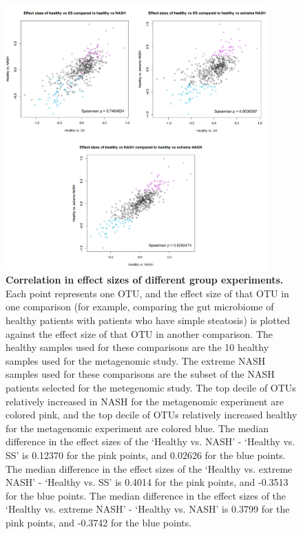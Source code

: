 \begin{figure}[h]
\begin{center}
\includegraphics[width=0.9\textwidth]{nafld_16s_effect_sizes.png}
\caption[Correlation in effect sizes of different group experiments.]{\textbf{Correlation in effect sizes of different group experiments.} Each point represents one OTU, and the effect size of that OTU in one comparison (for example, comparing the gut microbiome of healthy patients with patients who have simple steatosis) is plotted against the effect size of that OTU in another comparison. The healthy samples used for these comparisons are the 10 healthy samples used for the metagenomic study. The extreme NASH samples used for these comparisons are the subset of the NASH patients selected for the metegenomic study. The top decile of OTUs relatively increased in NASH for the metagenomic experiment are colored pink, and the top decile of OTUs relatively increased healthy for the metagenomic experiment are colored blue. The median difference in the effect sizes of the `Healthy vs. NASH' - `Healthy vs. SS' is 0.12370 for the pink points, and 0.02626 for the blue points. The median difference in the effect sizes of the `Healthy vs. extreme NASH' - `Healthy vs. SS' is 0.4014 for the pink points, and -0.3513 for the blue points. The median difference in the effect sizes of the `Healthy vs. extreme NASH' - `Healthy vs. NASH' is 0.3799 for the pink points, and -0.3742 for the blue points. }
\label{nafld_fig4}
\end{center}
\end{figure}

